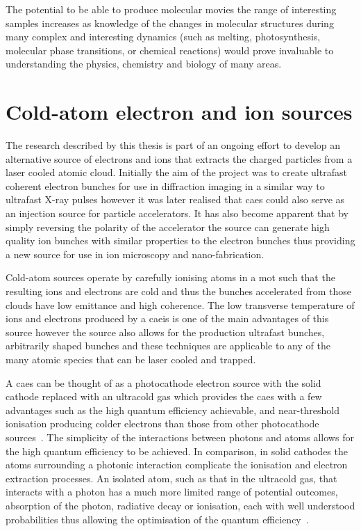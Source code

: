 The potential to be able to produce molecular movies the range of interesting samples increases as knowledge of the changes in molecular structures during many complex and interesting dynamics (such as melting, photosynthesis, molecular phase transitions, or chemical reactions) would prove invaluable to understanding the physics, chemistry and biology of many areas.

\section{Cold-atom electron and ion sources}

The research described by this thesis is part of an ongoing effort to develop an alternative source of electrons and ions that extracts the charged particles from a laser cooled atomic cloud.
Initially the aim of the project was to create ultrafast coherent electron bunches for use in diffraction imaging in a similar way to ultrafast X-ray pulses however it was later realised that \gls{caes} could also serve as an injection source for particle accelerators.
It has also become apparent that by simply reversing the polarity of the accelerator the source can generate high quality ion bunches with similar properties to the electron bunches thus providing a new source for use in ion microscopy and nano-fabrication.

Cold-atom sources operate by carefully ionising atoms in a \gls{mot} such that the resulting ions and electrons are cold and thus the bunches accelerated from those clouds have low emittance and high coherence.
The low transverse temperature of ions and electrons produced by a \gls{caeis} is one of the main advantages of this source however the source also allows for the production ultrafast bunches, arbitrarily shaped bunches and these techniques are applicable to any of the many atomic species that can be laser cooled and trapped.

A \gls{caes} can be thought of as a photocathode electron source with the solid cathode replaced with an ultracold gas which provides the \gls{caes} with a few advantages such as the high quantum efficiency achievable, and near-threshold ionisation producing colder electrons than those from other photocathode sources~\cite{engelen_effective_2014}.
The simplicity of the interactions between photons and atoms allows for the high quantum efficiency to be achieved.
In comparison, in solid cathodes the atoms surrounding a photonic interaction complicate the ionisation and electron extraction processes.
An isolated atom, such as that in the ultracold gas, that interacts with a photon has a much more limited range of potential outcomes, absorption of the photon, radiative decay or ionisation, each with well understood probabilities thus allowing the optimisation of the quantum efficiency~\cite{baranov_field_1994}.

